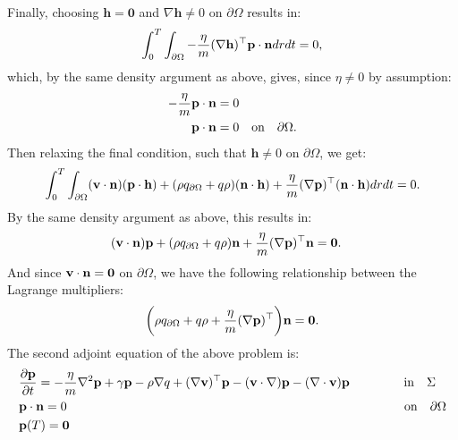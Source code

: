 Finally, choosing $\mathbf{h}=\mathbf{0}$ and $\nabla \mathbf{h}  \neq 0$ on $\partial \Omega$ results in:
\begin{align*}
\int_0^T \int_{\partial \Omega} - \frac{\eta}{m} (\nabla \mathbf{h})^\top \mathbf{p} \cdot \mathbf{n} dr dt = 0,
\end{align*}
which, by the same density argument as above, gives, since $\eta \neq 0$ by assumption:
\begin{align}
\label{CondAdj1}
- \frac{\eta}{m}  \mathbf{p}  \cdot \mathbf{n}&= 0  \notag\\
 \mathbf{p}  \cdot \mathbf{n} &= 0 \quad \text{on} \quad \partial \Omega.
\end{align}
Then relaxing the final condition, such that $\mathbf{h} \neq 0$ on $\partial \Omega$, we get:
\begin{align*}
\int_0^T \int_{\partial\Omega} (\mathbf{v} \cdot \mathbf{n})(\mathbf{p} \cdot \mathbf{h}) +(\rho  {q}_{\partial \Omega} + q \rho)  (\mathbf{n}\cdot \mathbf{h}) +\frac{\eta}{m}  (\nabla \mathbf{p})^\top ( \mathbf{n}\cdot \mathbf{h})dr dt=0.
\end{align*}
By the same density argument as above, this results in:
\begin{align*}
&(\mathbf{v} \cdot \mathbf{n})\mathbf{p}  +(\rho  {q}_{\partial \Omega} + q \rho)\mathbf{n}+\frac{\eta}{m}  (\nabla \mathbf{p})^\top \mathbf{n} =\mathbf{0}.
\end{align*}
And since $\mathbf{v} \cdot \mathbf{n} = \mathbf{0}$ on $\partial \Omega$, we have the following relationship between the Lagrange multipliers:
\begin{align*}
\bigg(\rho  {q}_{\partial \Omega} + q \rho + \frac{\eta}{m}  (\nabla \mathbf{p})^\top \bigg) \mathbf{n} =\mathbf{0}.
\end{align*}
The second adjoint equation of the above problem is:
\begin{align}
\label{eqn:INAdj2}
&\frac{\partial \mathbf{p}}{\partial t} =  - \frac{\eta}{m} \nabla^2 \mathbf{p}  + \gamma\mathbf{p}-\rho\nabla q +(\nabla \mathbf{v})^\top\mathbf{p} 
- (\mathbf{v} \cdot \nabla)\mathbf{p} -  (\nabla \cdot \mathbf{v})\mathbf{p}     \ \qquad\qquad \text{in} \quad \Sigma\\
&\mathbf{p} \cdot \mathbf{n} = 0 \qquad \qquad \qquad \qquad \qquad \qquad \qquad \qquad \qquad \qquad \qquad\qquad \qquad\quad \text{on} \quad \partial \Omega \notag \\
&\mathbf{p}(T)=\mathbf{0} \notag
\end{align}
